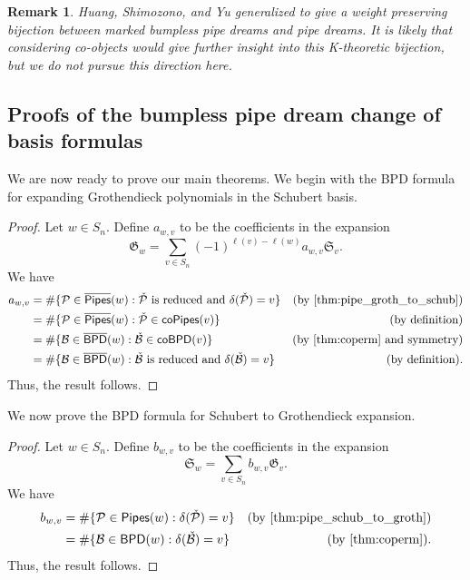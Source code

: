 \documentclass[12 pt]{amsart}
\newtheorem{remark}[Theorem]{Remark}
\numberwithin{equation}{section}
\theoremstyle{remark}
\newcommand{\pipes}{{\sf Pipes}}
\newcommand{\kpipes}{\overline{\sf Pipes}}
\newcommand{\bpd}{{\sf BPD}}
\newcommand{\kbpd}{\overline{\sf BPD}}
\newcommand{\cobpd}{{\sf coBPD}}
\newcommand{\copipes}{{\sf coPipes}}
\newcommand{\demprod}{\delta}
\begin{document}
		\begin{remark}
		Huang, Shimozono, and Yu \cite{Huang.Shimozono.Yu} generalized \cite{Gao.Huang} to give a weight preserving bijection between marked bumpless pipe dreams and pipe dreams.
		It is likely that considering co-objects would give further insight into this K-theoretic bijection, but we do not pursue this direction here.
		\end{remark}
				
		\subsection{Proofs of the bumpless pipe dream change of basis formulas}
		
		We are now ready to prove our main theorems. 
		We begin with the BPD formula for expanding Grothendieck polynomials in the Schubert basis.
		
		\thmmainA*
		
		\begin{proof}
			Let $w \in S_n$. Define $a_{w,v}$ to be the coefficients in the expansion
			\[
			\mathfrak{G}_w = \sum_{v \in S_n} (-1)^{\ell(v) - \ell(w)} a_{w,v} \mathfrak{S}_v.
			\]
			We have 
			\begin{align*}
				a_{w,v} 
				&= \#\{ \mathcal{P} \in \kpipes(w) : \check{\mathcal{P}} \text{ is reduced and } \demprod(\check{\mathcal{P}}) = v \} & \text{(by \cref{thm:pipe_groth_to_schub})} \\
				&= \#\{ \mathcal{P} \in \kpipes(w) : \check{\mathcal{P}} \in \copipes(v) \} &\text{(by definition)} \\
				&= \#\{ \mathcal{B} \in \kbpd(w) : \check{\mathcal{B}} \in \cobpd(v) \} & \text{(by \cref{thm:coperm} and symmetry)} \\
				&=\#\{\mathcal{B} \in \kbpd(w) : \check{\mathcal{B}} \text{ is reduced and } \demprod(\check{\mathcal{B}}) = v\} &\text{(by definition).}
			\end{align*}
		Thus, the result follows.
		\end{proof}
	
	
		We now prove the BPD formula for Schubert to Grothendieck expansion.
		\thmmainB*
		\begin{proof}
			Let $w \in S_n$. Define $b_{w,v}$ to be the coefficients in the expansion
			\[
			\mathfrak{S}_w = \sum_{v \in S_n} b_{w,v} \mathfrak{G}_v.
			\]
			We have
			\begin{align*}
				b_{w,v}
				&= \#\{ \mathcal{P} \in \pipes(w) : \demprod(\check{\mathcal{P}}) = v \} &\text{(by \cref{thm:pipe_schub_to_groth})} \\
				&=\#\{ \mathcal{B} \in \bpd(w) : \demprod(\check{\mathcal{B}}) = v \} & \text{(by \cref{thm:coperm}).} 
			\end{align*}
		Thus, the result follows.
		\end{proof}
		
\end{document}

